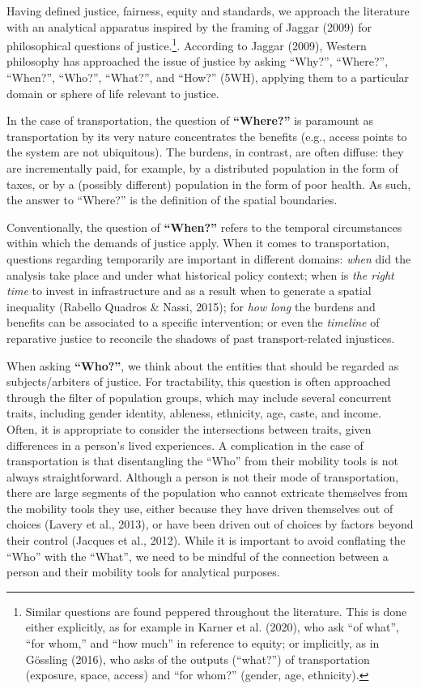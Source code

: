 \documentclass[
  letterpaper,
  DIV=11,
  numbers=noendperiod]{scrartcl}
\begin{document}
Having defined justice, fairness, equity and standards, we approach the
literature with an analytical apparatus inspired by the framing of
Jaggar (2009) for philosophical questions of justice.\footnote{Similar
  questions are found peppered throughout the literature. This is done
  either explicitly, as for example in Karner et al. (2020), who ask
  ``of what'', ``for whom,'' and ``how much'' in reference to equity; or
  implicitly, as in Gössling (2016), who asks of the outputs (``what?'')
  of transportation (exposure, space, access) and ``for whom?'' (gender,
  age, ethnicity).}. According to Jaggar (2009), Western philosophy has
approached the issue of justice by asking ``Why?'', ``Where?'',
``When?'', ``Who?'', ``What?'', and ``How?'' (5WH), applying them to a
particular domain or sphere of life relevant to justice.

In the case of transportation, the question of \textbf{``Where?''} is
paramount as transportation by its very nature concentrates the benefits
(e.g., access points to the system are not ubiquitous). The burdens, in
contrast, are often diffuse: they are incrementally paid, for example,
by a distributed population in the form of taxes, or by a (possibly
different) population in the form of poor health. As such, the answer to
``Where?'' is the definition of the spatial boundaries.

Conventionally, the question of \textbf{``When?''} refers to the
temporal circumstances within which the demands of justice apply. When
it comes to transportation, questions regarding temporarily are
important in different domains: \emph{when} did the analysis take place
and under what historical policy context; when is \emph{the right time}
to invest in infrastructure and as a result when to generate a spatial
inequality (Rabello Quadros \& Nassi, 2015); for \emph{how long} the
burdens and benefits can be associated to a specific intervention; or
even the \emph{timeline} of reparative justice to reconcile the shadows
of past transport-related injustices.

When asking \textbf{``Who?''}, we think about the entities that should
be regarded as subjects/arbiters of justice. For tractability, this
question is often approached through the filter of population groups,
which may include several concurrent traits, including gender identity,
ableness, ethnicity, age, caste, and income. Often, it is appropriate to
consider the intersections between traits, given differences in a
person's lived experiences. A complication in the case of transportation
is that disentangling the ``Who'' from their mobility tools is not
always straightforward. Although a person is not their mode of
transportation, there are large segments of the population who cannot
extricate themselves from the mobility tools they use, either because
they have driven themselves out of choices (Lavery et al., 2013), or
have been driven out of choices by factors beyond their control (Jacques
et al., 2012). While it is important to avoid conflating the ``Who''
with the ``What'', we need to be mindful of the connection between a
person and their mobility tools for analytical purposes.
\end{document}
